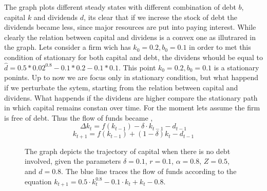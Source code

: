 \documentclass[12pt]{article}
\begin{document}
The graph plots different steady states with different combination of debt \(b\), capital \(k\) and dividends \(d\), its
clear that if we increse the stock of debt the dividends became less, since major resources are put into paying
interest. 
While clearly the relation between capital and dividens is a convex one as illutrared in the  graph.
Lets consider a firm wich has \(k_0=0.2, b_0=0.1\) in order to met this condition of stationary for both capital and
debt, the dividens whould be equal to \(\widehat{d} = 0.5*0.02^{0.8} - 0.1 *0.2 - 0.1*0.1\). This point \(k_0=0.2,
b_0=0.1\) is a stationary ponints.
Up to now we are focus only in stationary condition, but what happend if we perturbate the sytem, starting from the
relation between capital and dividens. What happends if the dividens are higher compare the stationary path in which
capital remains constan over time. For the moment lets assume the firm is free of debt. Thus the flow of funds became ,
\[\Delta k_t = f(k_{t-1}) - \delta \cdot k_{t-1} - d_{t-1}\]
\[k_{t+1} = f(k_{t-1}) + (1 -\delta)k_t - d_{t-1} \]
\begin{figure}
    \centering
    \caption{The graph depicts the trajectory of capital when there is no debt involved, given the parameters \(\delta =
    0.1\), \(r = 0.1\), \(\alpha = 0.8\), \(Z = 0.5\), and \(d = 0.8\). The blue line traces the flow of funds according
    to the equation \(k_{t+1} = 0.5 \cdot k_t^{0.8} - 0.1 \cdot k_t + k_t - 0.8\). }
\end{figure}
\end{document}
